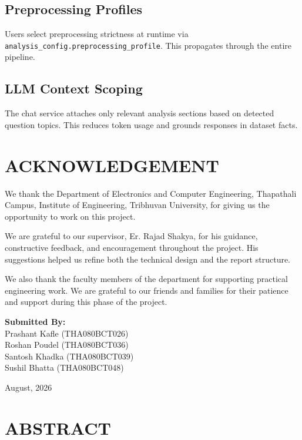 \documentclass[12pt,a4paper,openany]{report}
\begin{document}
\section{Preprocessing Profiles}

Users select preprocessing strictness at runtime via \texttt{analysis\_config.preprocessing\_profile}. This propagates through the entire pipeline.

\section{LLM Context Scoping}

The chat service attaches only relevant analysis sections based on detected question topics. This reduces token usage and grounds responses in dataset facts.


\chapter*{ACKNOWLEDGEMENT}

\begin{small}
We thank the Department of Electronics and Computer Engineering, Thapathali Campus, Institute of Engineering, Tribhuvan University, for giving us the opportunity to work on this project.

We are grateful to our supervisor, Er. Rajad Shakya, for his guidance, constructive feedback, and encouragement throughout the project. His suggestions helped us refine both the technical design and the report structure.

We also thank the faculty members of the department for supporting practical engineering work. We are grateful to our friends and families for their patience and support during this phase of the project.

\vspace{2em}
\noindent\textbf{Submitted By:}\\
Prashant Kafle (THA080BCT026)\\
Roshan Poudel (THA080BCT036)\\
Santosh Khadka (THA080BCT039)\\
Sushil Bhatta (THA080BCT048)

\vspace{1em}
\hfill August, 2026
\end{small}

\clearpage

\chapter*{ABSTRACT}
\end{document}

